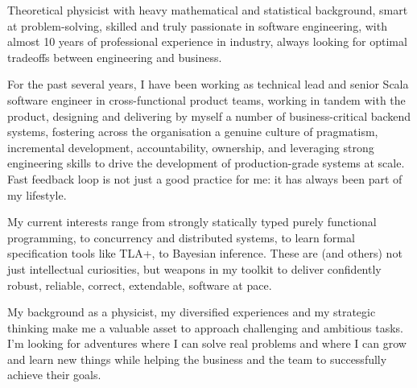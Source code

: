 
\begin{cvparagraph}
Theoretical physicist with heavy mathematical and statistical 
background, smart at problem-solving, skilled and truly passionate in software engineering, with almost 10 years of professional experience in industry, always looking for optimal tradeoffs between engineering and business.

  For the past several years, I have been working as technical lead and senior Scala software engineer in cross-functional product teams, working in tandem with the product, designing and delivering by myself a number of business-critical backend systems, fostering  across the organisation a genuine culture of pragmatism, incremental development, accountability, ownership, and leveraging strong engineering skills 
  to drive the development of production-grade systems at scale. Fast feedback loop is not just a good practice for me: it has always been part of my lifestyle.

  My current interests range from strongly statically typed purely functional programming, to concurrency and distributed systems, to learn formal specification tools like TLA+, to Bayesian inference. These are (and others) not just intellectual curiosities, but weapons in my toolkit to deliver confidently robust, reliable, correct, extendable, software at pace. 

My background as a physicist, my diversified experiences and my strategic thinking make me a valuable asset to approach challenging and ambitious tasks. I'm looking for adventures where I can solve real problems and where I can grow and learn new things while helping the business and the team to successfully achieve their goals. 
\end{cvparagraph}

